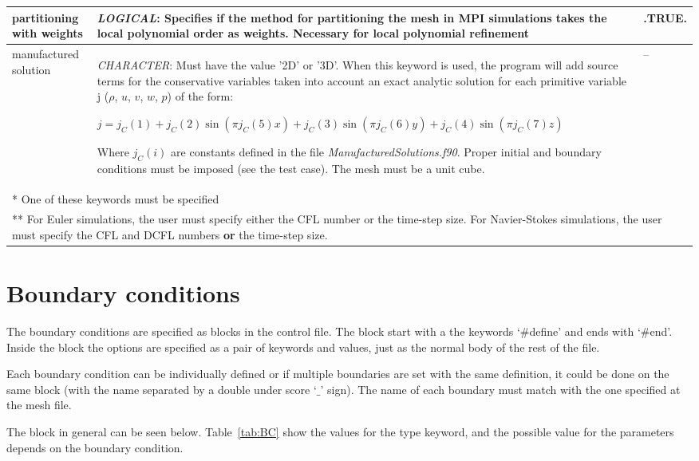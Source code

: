 \documentclass[a4paper,10pt]{report}
\begin{document}
\begin{longtable}{|p{4cm}|p{10cm}|p{2.2cm}|}
partitioning with weights & \textit{LOGICAL}: Specifies if the method for partitioning the mesh in MPI simulations takes the local polynomial order as weights. Necessary for local polynomial refinement & .TRUE. \\ \hline

manufactured solution & \textit{CHARACTER}: Must have the value '2D' or '3D'. When this keyword is used, the program will add source terms for the conservative variables taken into account an exact analytic solution for each primitive variable j ($\rho$, $u$, $v$, $w$, $p$) of the form:\

$j = j_C(1) + j_C(2) \sin(\pi j_C(5) x) + j_C(3) \sin(\pi j_C(6) y) + j_C(4) \sin(\pi j_C(7) z) $\

Where $j_C(i)$ are constants defined in the file \textit{ManufacturedSolutions.f90}. Proper initial and boundary conditions must be imposed (see the test case). The mesh must be a unit cube.
  & -- \\ \hline

\multicolumn{3}{p{16.4cm}}{*  One of these keywords must be specified} \\

\multicolumn{3}{p{16.4cm}}{** For Euler simulations, the user must specify either the CFL number or the time-step size. For Navier-Stokes simulations, the user must specify the CFL and DCFL numbers \textbf{or} the time-step size.}

\end{longtable}

\section{Boundary conditions}

The boundary conditions are specified as blocks in the control file. The block start with a the keywords `\#define' and ends with `\#end'. Inside the block the options are specified as a pair of keywords and values, just as the normal body of the rest of the file.

Each boundary condition can be individually defined or if multiple boundaries are set with the same definition, it could be done on the same block (with the name separated by a double under score `$\_$' sign). The name of each boundary must match with the one specified at the mesh file.

The block in general can be seen below. Table~\ref{tab:BC} show the values for the type keyword, and the possible value for the parameters depends on the boundary condition.
\end{document}
